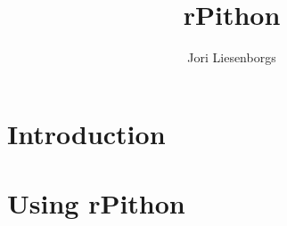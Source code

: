 \documentclass[a4paper,11pt]{article}
\begin{document}
	
	\title{rPithon}
	\author{Jori Liesenborgs}
	\maketitle

	\section{Introduction}

	\section{Using rPithon}
\end{document}
